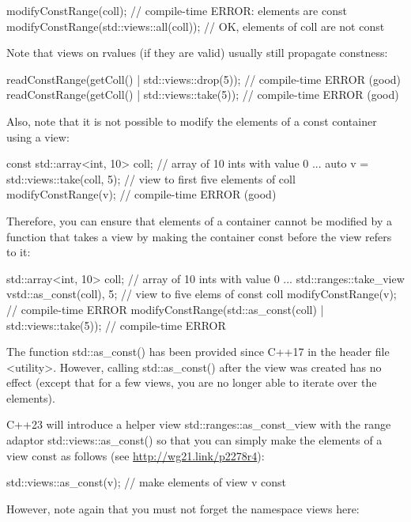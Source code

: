 \begin{cpp}
modifyConstRange(coll); // compile-time ERROR: elements are const
modifyConstRange(std::views::all(coll)); // OK, elements of coll are not const
\end{cpp}

Note that views on rvalues (if they are valid) usually still propagate constness:

\begin{cpp}
readConstRange(getColl() | std::views::drop(5)); // compile-time ERROR (good)
readConstRange(getColl() | std::views::take(5)); // compile-time ERROR (good)
\end{cpp}

Also, note that it is not possible to modify the elements of a const container using a view:

\begin{cpp}
const std::array<int, 10> coll{}; // array of 10 ints with value 0
...
auto v = std::views::take(coll, 5); // view to first five elements of coll
modifyConstRange(v); // compile-time ERROR (good)
\end{cpp}

Therefore, you can ensure that elements of a container cannot be modified by a function that takes a view by making the container const before the view refers to it:

\begin{cpp}
std::array<int, 10> coll{}; // array of 10 ints with value 0
...
std::ranges::take_view v{std::as_const(coll), 5}; // view to five elems of const coll
modifyConstRange(v); // compile-time ERROR
modifyConstRange(std::as_const(coll) | std::views::take(5)); // compile-time ERROR
\end{cpp}

The function std::as\_const() has been provided since C++17 in the header file <utility>. However, calling std::as\_const() after the view was created has no effect (except that for a few views, you are no longer able to iterate over the elements).

C++23 will introduce a helper view std::ranges::as\_const\_view with the range adaptor std::views::as\_const() so that you can simply make the elements of a view const as follows (see \url{http://wg21.link/p2278r4}):

\begin{cpp}
std::views::as_const(v); // make elements of view v const
\end{cpp}

However, note again that you must not forget the namespace views here:


